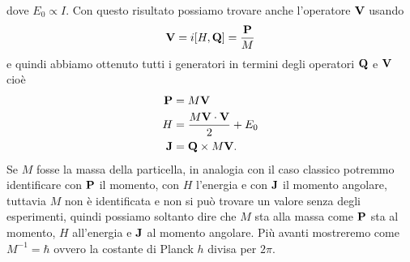 dove $ E_0 \propto I $. Con questo risultato possiamo trovare anche l'operatore $ \mathbf{V} $ usando 
\begin{align*}
  \mathbf{V} = i[H, \mathbf{Q}] = \frac{\mathbf{P}}{M}
\end{align*}
e quindi abbiamo ottenuto tutti i generatori in termini degli operatori $ \mathbf{Q} $ e $ \mathbf{V} $ cioè 
\begin{align*}
  \mathbf{P} &= M \mathbf{V}
  \\
  H &= \frac{M \mathbf{V\cdot V}}{2} + E_0
  \\
  \mathbf{J} &= \mathbf{Q} \times M \mathbf{V}.
\end{align*}
Se $ M $ fosse la massa della particella, in analogia con il caso classico potremmo identificare con $ \mathbf{P} $ il momento, con $ H $ l'energia e 
con $ \mathbf{J} $ il momento angolare, tuttavia $ M $ non è identificata e non si può trovare un valore senza degli esperimenti, quindi possiamo soltanto 
dire che $ M $ sta alla massa come $ \mathbf{P} $ sta al momento, $ H $ all'energia e $ \mathbf{J} $ al momento angolare. Più avanti mostreremo 
come $ M^{-1} = \hbar $ ovvero la costante di Planck $ h $ divisa per $ 2\pi $. 

